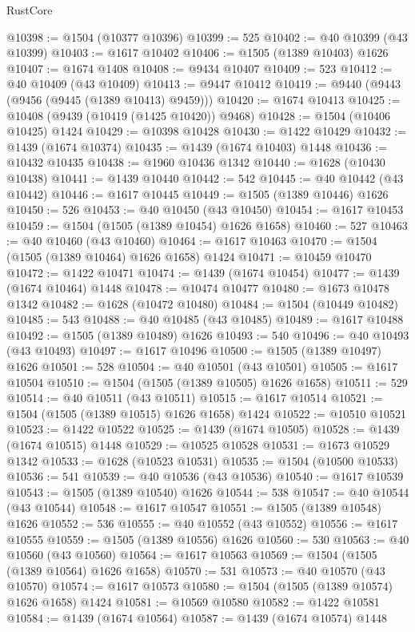 \begin{lexlean}{RustCore}
\begin{coremodule}
@10398 := @1504 (@10377 @10396)
@10399 := 525
@10402 := @40 @10399 (@43 @10399)
@10403 := @1617 @10402
@10406 := @1505 (@1389 @10403) @1626
@10407 := @1674 @1408
@10408 := @9434 @10407
@10409 := 523
@10412 := @40 @10409 (@43 @10409)
@10413 := @9447 @10412
@10419 := @9440 (@9443 (@9456 (@9445 (@1389 @10413) @9459)))
@10420 := @1674 @10413
@10425 := @10408 (@9439 (@10419 (@1425 @10420)) @9468)
@10428 := @1504 (@10406 @10425) @1424
@10429 := @10398 @10428
@10430 := @1422 @10429
@10432 := @1439 (@1674 @10374)
@10435 := @1439 (@1674 @10403) @1448
@10436 := @10432 @10435
@10438 := @1960 @10436 @1342
@10440 := @1628 (@10430 @10438)
@10441 := @1439 @10440
@10442 := 542
@10445 := @40 @10442 (@43 @10442)
@10446 := @1617 @10445
@10449 := @1505 (@1389 @10446) @1626
@10450 := 526
@10453 := @40 @10450 (@43 @10450)
@10454 := @1617 @10453
@10459 := @1504 (@1505 (@1389 @10454) @1626 @1658)
@10460 := 527
@10463 := @40 @10460 (@43 @10460)
@10464 := @1617 @10463
@10470 := @1504 (@1505 (@1389 @10464) @1626 @1658) @1424
@10471 := @10459 @10470
@10472 := @1422 @10471
@10474 := @1439 (@1674 @10454)
@10477 := @1439 (@1674 @10464) @1448
@10478 := @10474 @10477
@10480 := @1673 @10478 @1342
@10482 := @1628 (@10472 @10480)
@10484 := @1504 (@10449 @10482)
@10485 := 543
@10488 := @40 @10485 (@43 @10485)
@10489 := @1617 @10488
@10492 := @1505 (@1389 @10489) @1626
@10493 := 540
@10496 := @40 @10493 (@43 @10493)
@10497 := @1617 @10496
@10500 := @1505 (@1389 @10497) @1626
@10501 := 528
@10504 := @40 @10501 (@43 @10501)
@10505 := @1617 @10504
@10510 := @1504 (@1505 (@1389 @10505) @1626 @1658)
@10511 := 529
@10514 := @40 @10511 (@43 @10511)
@10515 := @1617 @10514
@10521 := @1504 (@1505 (@1389 @10515) @1626 @1658) @1424
@10522 := @10510 @10521
@10523 := @1422 @10522
@10525 := @1439 (@1674 @10505)
@10528 := @1439 (@1674 @10515) @1448
@10529 := @10525 @10528
@10531 := @1673 @10529 @1342
@10533 := @1628 (@10523 @10531)
@10535 := @1504 (@10500 @10533)
@10536 := 541
@10539 := @40 @10536 (@43 @10536)
@10540 := @1617 @10539
@10543 := @1505 (@1389 @10540) @1626
@10544 := 538
@10547 := @40 @10544 (@43 @10544)
@10548 := @1617 @10547
@10551 := @1505 (@1389 @10548) @1626
@10552 := 536
@10555 := @40 @10552 (@43 @10552)
@10556 := @1617 @10555
@10559 := @1505 (@1389 @10556) @1626
@10560 := 530
@10563 := @40 @10560 (@43 @10560)
@10564 := @1617 @10563
@10569 := @1504 (@1505 (@1389 @10564) @1626 @1658)
@10570 := 531
@10573 := @40 @10570 (@43 @10570)
@10574 := @1617 @10573
@10580 := @1504 (@1505 (@1389 @10574) @1626 @1658) @1424
@10581 := @10569 @10580
@10582 := @1422 @10581
@10584 := @1439 (@1674 @10564)
@10587 := @1439 (@1674 @10574) @1448

\end{coremodule}
\end{lexlean}
